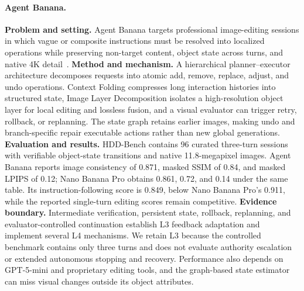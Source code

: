 \paragraph{Agent Banana.}
\textbf{Problem and setting.} Agent Banana targets professional image-editing sessions in which vague or composite instructions must be resolved into localized operations while preserving non-target content, object state across turns, and native 4K detail~\cite{ye2026agentbanana}. \textbf{Method and mechanism.} A hierarchical planner--executor architecture decomposes requests into atomic add, remove, replace, adjust, and undo operations. Context Folding compresses long interaction histories into structured state, Image Layer Decomposition isolates a high-resolution object layer for local editing and lossless fusion, and a visual evaluator can trigger retry, rollback, or replanning. The state graph retains earlier images, making undo and branch-specific repair executable actions rather than new global generations. \textbf{Evaluation and results.} HDD-Bench contains 96 curated three-turn sessions with verifiable object-state transitions and native 11.8-megapixel images. Agent Banana reports image consistency of 0.871, masked SSIM of 0.84, and masked LPIPS of 0.12; Nano Banana Pro obtains 0.861, 0.72, and 0.14 under the same table. Its instruction-following score is 0.849, below Nano Banana Pro's 0.911, while the reported single-turn editing scores remain competitive. \textbf{Evidence boundary.} Intermediate verification, persistent state, rollback, replanning, and evaluator-controlled continuation establish L3 feedback adaptation and implement several L4 mechanisms. We retain L3 because the controlled benchmark contains only three turns and does not evaluate authority escalation or extended autonomous stopping and recovery. Performance also depends on GPT-5-mini and proprietary editing tools, and the graph-based state estimator can miss visual changes outside its object attributes.

